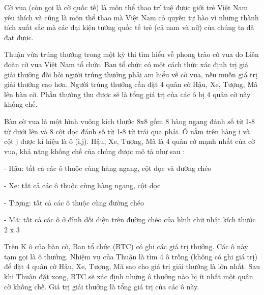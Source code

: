 Cờ vua (còn gọi là cờ quốc tế) là môn thể thao trí tuệ được giới trẻ Việt Nam yêu thích và cũng là môn thể thao mà Việt Nam có quyền tự hào vì những thành tích xuất sắc mà các đại kiện tướng quốc tế trẻ (cả nam và nữ) của chúng ta đã đạt được.

Thuận vừa trúng thưởng trong một kỳ thi tìm hiểu về phong trào cờ vua do Liên đoàn cờ vua Việt Nam tổ chức. Ban tổ chức có một cách thức xác định trị giá giải thưởng đòi hỏi người trúng thưởng phải am hiểu về cờ vua, nếu muốn giá trị giải thưởng cao hơn. Người trúng thưởng cần đặt 4 quân cờ Hậu, Xe, Tượng, Mã lên bàn cờ. Phần thưởng thu được sẽ là tổng giá trị của các ô bị 4 quân cờ này khống chế.

Bàn cờ vua là một hình vuông kích thước 8x8 gồm 8 hàng ngang đánh số từ 1-8 từ dưới lên và 8 cột dọc đánh số từ 1-8 từ trái qua phải. Ô nằm trên hàng i và cột j được kí hiệu là ô (i,j). Hậu, Xe, Tượng, Mã là 4 quân cờ mạnh nhất của cờ vua, khả năng khống chế của chúng được mô tả như sau :

- Hậu: tất cả các ô thuộc cùng hàng ngang, cột dọc và đường chéo

- Xe: tất cả các ô thuộc cùng hàng ngang, cột dọc

- Tượng: tất cả các ô thuộc cùng đường chéo

- Mã: tất cả các ô ở đỉnh dối diện trên đường chéo của hình chữ nhật kích thước 2 x 3

Trên K ô của bàn cờ, Ban tổ chức (BTC) có ghi các giá trị thưởng. Các ô này tạm gọi là ô thưởng. Nhiệm vụ của Thuận là tìm 4 ô trống (không có ghi giá trị) để đặt 4 quân cờ Hậu, Xe, Tượng, Mã sao cho giá trị giải thưởng là lớn nhất. Sau khi Thuận đặt xong, BTC sẽ xác định những ô thưởng nào bị ít nhất một quân cờ khống chế. Giá trị giải thưởng là tổng giá trị của các ô này.

\